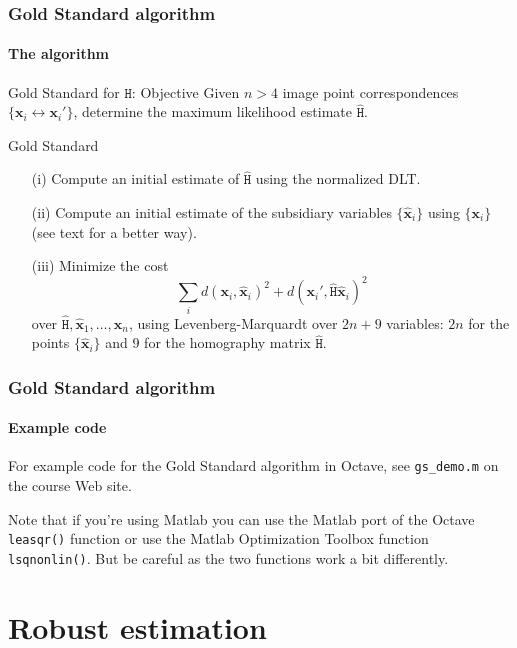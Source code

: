 \documentclass[aspectratio=169]{beamer}
\renewcommand{\vec}[1]{\boldsymbol{#1}}
\newcommand{\mat}[1]{\mathtt{#1}}
\begin{document}
\begin{frame}
\frametitle{Gold Standard algorithm}
\framesubtitle{The algorithm}

\begin{block}{Gold Standard for $\mat{H}$: Objective}
  Given $n>4$ image point correspondences $\{\vec{x}_i \leftrightarrow
  \vec{x}_i' \}$, determine the maximum likelihood estimate
  $\hat{\mat{H}}$.
\end{block}

\begin{block}{Gold Standard }%
\begin{itemize}
\item[(i)] Compute an initial estimate of $\hat{\mat{H}}$ using
  the normalized DLT.
\item[(ii)] Compute an initial estimate of the subsidiary variables
  $\{\hat{\vec{x}}_i\}$ using $\{\vec{x}_i\}$ (see text for a better
  way).
\item[(iii)] Minimize the cost
\begin{equation*}
\sum_i d(\vec{x}_i, \hat{\vec{x}}_i)^2 +
       d(\vec{x}_i', \hat{\mat{H}}\hat{\vec{x}}_i)^2
\end{equation*}
  over $\hat{\mat{H}},\hat{\vec{x}}_1,\ldots,\hat{\vec{x}}_n$, using
  Levenberg-Marquardt over $2n+9$ variables: $2n$ for the points
  $\{\hat{\vec{x}}_i\}$ and 9 for the homography matrix
  $\hat{\mat{H}}$.
\end{itemize}
\end{block}

\end{frame}

\begin{frame}
\frametitle{Gold Standard algorithm}
\framesubtitle{Example code}

For example code for the Gold Standard
algorithm in Octave, see \texttt{gs\_demo.m} on
the course Web site.

\medskip

Note that if you're using Matlab you can use the Matlab port of the
Octave \texttt{leasqr()} function or use the Matlab Optimization Toolbox
function \texttt{lsqnonlin()}.  But be careful as the two functions work
a bit differently.

\end{frame}

\section{Robust estimation}
\end{document}
